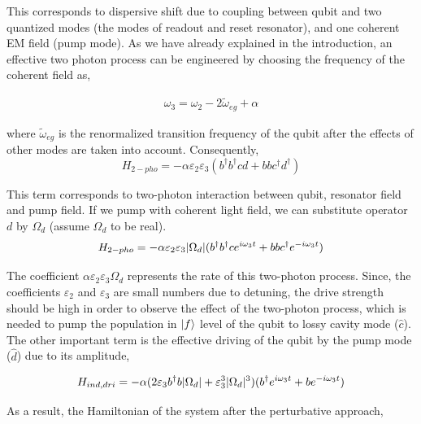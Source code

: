 This corresponds to dispersive shift due to coupling between qubit and two quantized modes (the modes of readout and reset resonator), and one coherent EM field (pump mode). As we have already explained in the introduction, an effective two photon process can be engineered by choosing the frequency of the coherent field as,

\begin{equation} \begin{split}
 \omega_3 = \omega_2 - 2\tilde{\omega}_{eg} + \alpha 
\end{split} \end{equation}

where $\tilde{\omega}_{eg}$ is the renormalized transition frequency of the qubit after the effects of other modes are taken into account. Consequently, 
\begin{equation}
	H_{2-pho} = -\alpha\varepsilon_2\varepsilon_3(b^\dagger b^\dagger cd+bbc^\dagger d^\dagger)
\end{equation}

This term corresponds to two-photon interaction between qubit, resonator field and pump field. If we pump with coherent light field, we can substitute operator $d$ by $\Omega_d$ (assume $\Omega_d$ to be real).
\begin{equation}
	H_{2-pho} = -\alpha\varepsilon_2\varepsilon_3\lvert \Omega_d \rvert (b^\dagger b^\dagger c e^{i\omega_3 t} + bbc^\dagger e^{-i\omega_3 t})
\end{equation}

The coefficient $\alpha\varepsilon_2\varepsilon_3\Omega_d$ represents the rate of this two-photon process. Since, the coefficients $\varepsilon_2$ and $\varepsilon_3$ are small numbers due to detuning, the drive strength should be high in order to observe the effect of the two-photon process, which is needed to pump the population in $\ket{f}$ level of the qubit to lossy cavity mode ($\hat{c}$). The other important term is the effective driving of the qubit by the pump mode ($\hat{d}$) due to its amplitude,

\begin{equation}
	H_{ind,dri} = -\alpha (2\varepsilon_3 b^\dagger b \lvert \Omega_d \rvert + \varepsilon_3^3 \lvert \Omega_d \rvert^3) (b^\dagger e^{i\omega_3 t} +b e^{-i \omega_3 t})
\end{equation}

As a result, the Hamiltonian of the system after the perturbative approach, 

